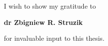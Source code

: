 \thispagestyle{empty}
\mbox
\vfill
\hfill I wish to show my gratitude to
\vspace{0.2cm}

\hfill \textbf{dr Zbigniew R. Struzik}
\vspace{0.2cm}

\hfill for invaluable input to this thesis.

\vspace{2cm}

